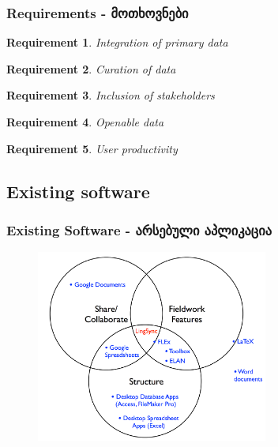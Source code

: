 \documentclass{beamer}
\newtheorem{requirement}{Requirement}
\begin{document}
\begin{frame}

\frametitle{Requirements - მოთხოვნები}
\begin{requirement}
\label{req:primary-data}
Integration of primary data
\end{requirement}


\begin{requirement}
\label{req:curation}
Curation of data
\end{requirement}


\begin{requirement}
\label{req:inclusive}
Inclusion of stakeholders
\end{requirement}

\begin{requirement}
\label{req:openable}
Openable data
\end{requirement}


\begin{requirement}
\label{req:productivity}
User productivity
\end{requirement}

\end{frame}


\subsection{Existing software }

\begin{frame}
\frametitle{Existing Software - არსებული აპლიკაცია}

\begin{figure}
\begin{center}
\includegraphics[width=3in]{../figures/other_software_sets}
\label{othersoftware}
\end{center}
\end{figure}

\end{frame}
\end{document}
